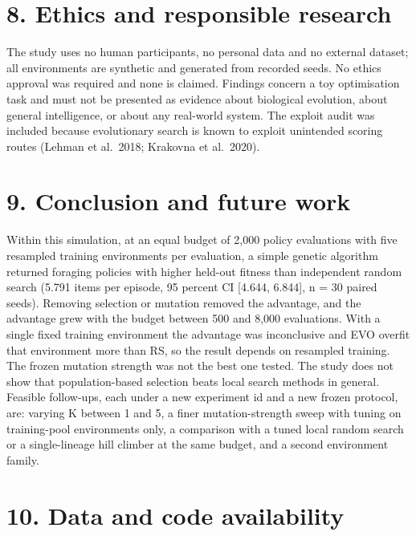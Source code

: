 \documentclass[
]{article}
\begin{document}
\section{8. Ethics and responsible
research}\label{ethics-and-responsible-research}

The study uses no human participants, no personal data and no external
dataset; all environments are synthetic and generated from recorded
seeds. No ethics approval was required and none is claimed. Findings
concern a toy optimisation task and must not be presented as evidence
about biological evolution, about general intelligence, or about any
real-world system. The exploit audit was included because evolutionary
search is known to exploit unintended scoring routes (Lehman et
al.~2018; Krakovna et al.~2020).

\section{9. Conclusion and future
work}\label{conclusion-and-future-work}

Within this simulation, at an equal budget of 2,000 policy evaluations
with five resampled training environments per evaluation, a simple
genetic algorithm returned foraging policies with higher held-out
fitness than independent random search (5.791 items per episode, 95
percent CI {[}4.644, 6.844{]}, n = 30 paired seeds). Removing selection
or mutation removed the advantage, and the advantage grew with the
budget between 500 and 8,000 evaluations. With a single fixed training
environment the advantage was inconclusive and EVO overfit that
environment more than RS, so the result depends on resampled training.
The frozen mutation strength was not the best one tested. The study does
not show that population-based selection beats local search methods in
general. Feasible follow-ups, each under a new experiment id and a new
frozen protocol, are: varying K between 1 and 5, a finer
mutation-strength sweep with tuning on training-pool environments only,
a comparison with a tuned local random search or a single-lineage hill
climber at the same budget, and a second environment family.

\section{10. Data and code
availability}\label{data-and-code-availability}
\end{document}
